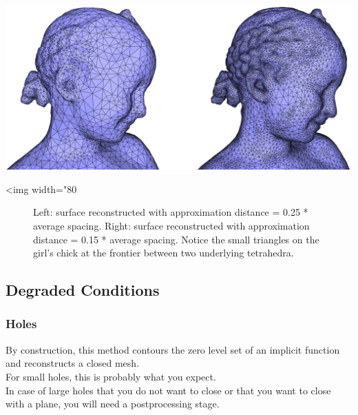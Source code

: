 \begin{center}
    \label{Surface_reconstruction_points_3-fig-contouring_bad}
    \begin{ccTexOnly}
      \includegraphics[width=1.0\textwidth]{Surface_reconstruction_points_3/contouring_bad} %
    \end{ccTexOnly}
    \begin{ccHtmlOnly}
        <img width="80%
    \end{ccHtmlOnly}
    \begin{figure}[h]
        \caption{Left: surface reconstructed with approximation distance = 0.25 * average spacing.
                 Right: surface reconstructed with approximation distance = 0.15 * average spacing.
                 Notice the small triangles on the girl's chick at the frontier between two underlying tetrahedra.}
    \end{figure}
\end{center}




\subsection{Degraded Conditions}

\subsubsection{Holes}

By construction, this method contours the zero level set of an implicit function and reconstructs a closed mesh.\\
For small holes, this is probably what you expect. \\
In case of large holes that you do not want to close or that you want to close with a plane, you will need a postprocessing stage.

